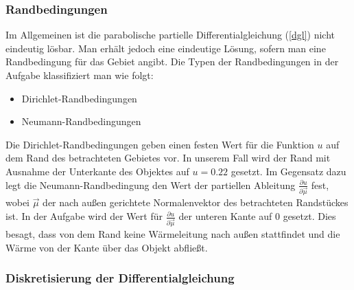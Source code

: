 \documentclass[10pt,a4paper]{article}
\begin{document}
\subsubsection{Randbedingungen}
\label{randbedingungen}
Im Allgemeinen ist die parabolische partielle Differentialgleichung (\ref{dgl}) nicht eindeutig lösbar. Man erhält jedoch eine eindeutige Lösung, sofern man eine Randbedingung für das Gebiet angibt. Die Typen der Randbedingungen in der Aufgabe klassifiziert man wie folgt:
\begin{itemize}
\item Dirichlet-Randbedingungen
\item Neumann-Randbedingungen
\end{itemize}
Die Dirichlet-Randbedingungen geben einen festen Wert für die Funktion $u$ auf dem Rand des betrachteten Gebietes vor. In unserem Fall wird der Rand mit Ausnahme der Unterkante des Objektes auf $u = \num{0.22}$ gesetzt. 
Im Gegensatz dazu legt die Neumann-Randbedingung den Wert der partiellen Ableitung $\frac{\partial u}{\partial \vec{\mu}}$ fest, wobei $\vec{\mu}$ der nach außen gerichtete Normalenvektor des betrachteten Randstückes ist. In der Aufgabe wird der Wert für $\frac{\partial u}{\partial \vec{\mu}}$ der unteren Kante auf $\num{0}$ gesetzt. Dies besagt, dass von dem Rand keine Wärmeleitung nach außen stattfindet und die Wärme von der Kante über das Objekt abfließt.

\subsubsection{Diskretisierung der Differentialgleichung}
\end{document}
